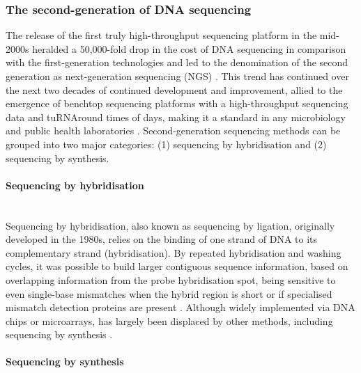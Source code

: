 \subsubsection{The second-generation of \ac{DNA} sequencing} \label{ssec:_intro_2nd_gen_seq}

The release of the first truly high-throughput sequencing platform in the mid-2000s heralded a 50,000-fold drop in the cost of \ac{DNA} sequencing in comparison with the first-generation technologies and led to the denomination of the second generation as next-generation sequencing (NGS) \citep{goodwin_coming_2016}. 
This trend has continued over the next two decades of continued development and improvement, allied to the emergence of benchtop sequencing platforms with a high-throughput sequencing data and tu\ac{RNA}round times of days, making it a standard in any microbiology and public health laboratories \citep{loman_twenty_2015}. 
Second-generation sequencing methods can be grouped into two major categories: (1) sequencing by hybridisation and (2) sequencing by synthesis. 

\paragraph{Sequencing by hybridisation} \label{sssec:_intro_2nd_gen_seq_hybrid} \mbox{}\\

Sequencing by hybridisation, also known as sequencing by ligation, originally developed in the 1980s, relies on the binding of one strand of \ac{DNA} to its complementary strand (hybridisation). 
By repeated hybridisation and washing cycles, it was possible to build larger contiguous sequence information, based on overlapping information from the probe hybridisation spot, being sensitive to even single-base mismatches when the hybrid region is short or if specialised mismatch detection proteins are present \citep{slatko_overview_2018, detter_nucleic_2014}. 
Although widely implemented via \ac{DNA} chips or microarrays, has largely been displaced by other methods, including sequencing by synthesis \citep{goodwin_coming_2016}. 

\paragraph{Sequencing by synthesis} \label{sssec:_intro_2nd_gen_seq_synth} \mbox{}\\

